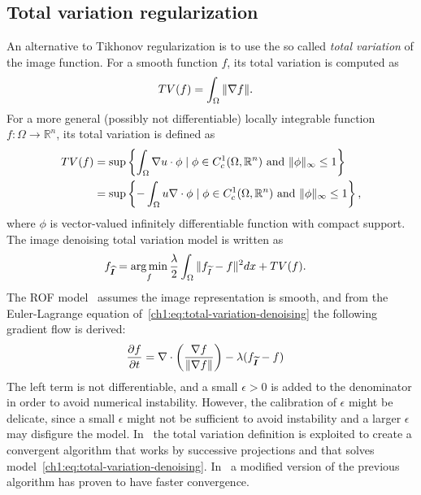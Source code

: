 \subsection{Total variation regularization}
An alternative to Tikhonov regularization is to use the so called \emph{total variation} of the image function. For a smooth function $f$, its total variation is computed as
\begin{align*}
	TV(f) &= \int_{\Omega}{ \lVert \nabla f \rVert }.
\end{align*}
%
For a more general (possibly not differentiable) locally integrable function $f:\Omega \rightarrow \mathbb{R}^n$, its total variation is defined as
\begin{align*}
	TV(f) &= \sup \left\{ \int_{\Omega}{\nabla u \cdot \phi} \; | \; \phi \in C_c^{1}(\Omega, \mathbb{R}^n) \text{ and } \lVert\phi\rVert_{\infty} \leq 1 \right\} \\
		  &= \sup \left\{ - \int_{\Omega}{u \nabla \cdot \phi} \; | \; \phi \in C_c^{1}(\Omega, \mathbb{R}^n) \text{ and } \lVert\phi\rVert_{\infty} \leq 1 \right\},	
\end{align*}
%
where $\phi$ is vector-valued infinitely differentiable function with compact support. The image denoising total variation model is written as
\begin{align}
	f_{\bm{\widehat{I}}} &= \operatorname*{arg\,min}_{f} \frac{\lambda}{2} \int_{\Omega}{ \lVert f_{\widetilde{I}} - f\rVert^2dx} + TV(f).
	\label{ch1:eq:total-variation-denoising}
\end{align}
%
The ROF model~\cite{rudin92} assumes the image representation is smooth, and from the Euler-Lagrange equation of~\cref{ch1:eq:total-variation-denoising} the following gradient flow is derived:
\begin{align*}
	\frac{\partial f}{\partial t} &= \nabla \cdot \left( \frac{\nabla f}{\lVert \nabla f\rVert } \right) - \lambda (f_{\widetilde{\bm{I}}} - f)
\end{align*}
%
The left term is not differentiable, and a small $\epsilon >0$ is added to the denominator in order to avoid numerical instability. However, the calibration of $\epsilon$ might be delicate, since a small $\epsilon$ might not be sufficient to avoid instability and a larger $\epsilon$ may disfigure the model. In~\cite{chambolle04} the total variation definition is exploited to create a convergent algorithm that works by successive projections and that solves model~\cref{ch1:eq:total-variation-denoising}. In~\cite{beck09a} a modified version of the previous algorithm has proven to have faster convergence. 

